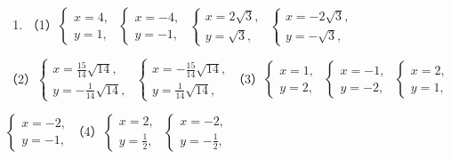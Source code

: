 \begin{enumerate}
\item
  （1）\(\left\{ \begin{array}{l} x = 4, \\ y = 1, \end{array} \right.\) \(\left\{ \begin{array}{l} x = -4, \\ y = -1, \end{array} \right.\) \(\left\{ \begin{array}{l} x = 2\sqrt{3}, \\ y = \sqrt{3}, \end{array} \right.\) \(\left\{ \begin{array}{l} x = -2\sqrt{3}, \\ y = -\sqrt{3}, \end{array} \right.\)
\end{enumerate}

（2）\(\left\{ \begin{array}{l} x = \frac{15}{14}\sqrt{14}, \\ y = -\frac{1}{14}\sqrt{14}, \end{array} \right.\) \(\left\{ \begin{array}{l} x = -\frac{15}{14}\sqrt{14}, \\ y = \frac{1}{14}\sqrt{14}, \end{array} \right.\)（3）\(\left\{ \begin{array}{l} x = 1, \\ y = 2, \end{array} \right.\) \(\left\{ \begin{array}{l} x = -1, \\ y = -2, \end{array} \right.\) \(\left\{ \begin{array}{l} x = 2, \\ y = 1, \end{array} \right.\)

\(\left\{ \begin{array}{l} x = -2, \\ y = -1, \end{array} \right.\)（4）\(\left\{ \begin{array}{l} x = 2, \\ y = \frac{1}{2}, \end{array} \right.\) \(\left\{ \begin{array}{l} x = -2, \\ y = -\frac{1}{2}, \end{array} \right.\)

